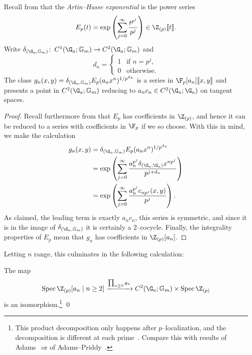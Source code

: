 \begin{lemma}
Recall from  that the \textit{Artin--Hasse exponential} is the power series \[E_p(t) = \exp\left( \sum_{j=0}^\infty \frac{t^{p^j}}{p^j} \right) \in \Z_{(p)}\ps{t}.\]  Write \(\delta_{(\G_a, \Gm)}\co C^1(\G_a; \Gm) \to C^2(\G_a; \Gm)\) and \[d_n = \begin{cases} 1 & \text{if \(n = p^j\)}, \\ 0 & \text{otherwise}. \end{cases}\]  The class \(g_n(x, y) = \delta_{(\G_a,\Gm)} E_p(a_n x^n)^{1/p^{d_n}}\) is a series in \(\F_p[a_n]\ps{x,y}\) and presents a point in \(C^2(\G_a; \Gm)\) reducing to \(a_n c_n \in C^2(\G_a; \G_a)\) on tangent spaces.
\end{lemma}
\begin{proof}
Recall furthermore from  that \(E_p\) has coefficients in \(\Z_{(p)}\), and hence it can be reduced to a series with coefficients in \(\F_p\) if we so choose.   With this in mind, we make the calculation
\begin{align*}
g_n(x, y) & = \delta_{(\G_a, \Gm)} E_p(a_n x^n)^{1/p^{d_n}} \\
& = \exp\left( \sum_{j=0}^\infty \frac{a_n^{p^j} \delta_{(\G_a, \G_a)} x^{np^j}}{p^{j + d_n}} \right) \\
& = \exp\left( \sum_{j=0}^\infty \frac{a_n^{p^j} c_{np^j}(x, y)}{p^j} \right).
\end{align*}
As claimed, the leading term is exactly \(a_n c_n\), this series is symmetric, and since it is in the image of \(\delta_{(\G_a, \Gm)}\) it is certainly a \(2\)--cocycle.  Finally, the integrality properties of \(E_p\) mean that \(g_n\) has coefficients in \(\Z_{(p)}[a_n]\).
\end{proof}

Letting \(n\) range, this culminates in the following calculation:

\begin{lemma}
The map \[\Spec \Z_{(p)}[a_n \mid n \ge 2] \xrightarrow{\prod_{n \ge 2} g_n} C^2(\G_a; \Gm) \times \Spec \Z_{(p)}\] is an isomorphism.\footnote{This product decomposition only happens after \(p\)--localization, and the decomposition is different at each prime~\cite[Section 3.3]{AHSTheoremOfTheCube}.  Compare this with results of Adams~\cite{AdamsPrimitiveElts} or of Adams--Priddy~\cite{AdamsPriddy}.} \qed
\end{lemma}

